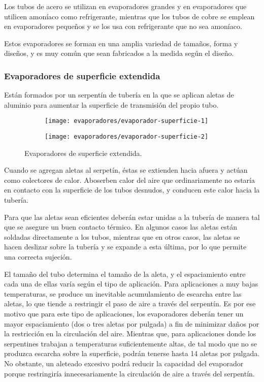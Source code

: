 			Los tubos de acero se utilizan en evaporadores grandes y en evaporadores que utilicen amoníaco como refrigerante, mientras que los tubos de cobre se emplean en evaporadores pequeños y se los usa con refrigerante que no sea amoníaco.
			
			Estos evaporadores se forman en una amplia variedad de tamaños, forma y diseños, y es muy común que sean fabricados a la medida según el diseño.
	
		\subsubsection{Evaporadores de superficie extendida}
		
			Están formados por un serpentín de tubería en la que se aplican aletas de aluminio para aumentar la superficie de transmisión del propio tubo.
			
			\begin{figure}[h]
				\centering
				\begin{subfigure}{.4\linewidth}
					\texttt{[image: evaporadores/evaporador-superficie-1]}
				\end{subfigure}
			\begin{subfigure}{.4\linewidth}
				\texttt{[image: evaporadores/evaporador-superficie-2]}
			\end{subfigure}
			\caption{Evaporadores de superficie extendida.}
			\label{fig:evaporadores-superficie}
			\end{figure}
			
			Cuando se agregan aletas al serpetín, éstas se extienden hacia afuera y actúan como colectores de calor. Aboserben calor del aire que ordinariamente no estaría en contacto con la superficie de los tubos desnudos, y conducen este calor hacia la tubería.
			
			
			Para que las aletas sean eficientes deberán estar unidas a la tubería de manera tal que se asegure un buen contacto térmico. En algunos casos las aletas están soldadas directamente a los tubos, mientras que en otros casos, las aletas se hacen deslizar sobre la tubería y se expande a esta última, por lo que permite una correcta sujeción.
		
		
			El tamaño del tubo determina el tamaño de la aleta, y el espaciamiento entre cada una de ellas varía según el tipo de aplicación. Para aplicaciones a muy bajas temperaturas, se produce un inevitable acumulamiento de escarcha entre las aletas, lo que tiende a restringir el paso de aire a través del serpentín. Es por ese motivo que para este tipo de aplicaciones, los evaporadores deberán tener un mayor espaciamiento (dos o tres aletas por pulgada) a fin de minimizar daños por la restricción en la circulación del aire. Mientras que, para aplicaciones donde los serpentines trabajan a temperaturas suficientemente altas, de tal modo que no se produzca escarcha sobre la superficie, podrán tenerse hasta 14 aletas por pulgada. No obstante, un aleteado excesivo podrá reducir la capacidad del evaporador porque restringiría innecesariamente la circulación de aire a través del serpentín.
		
